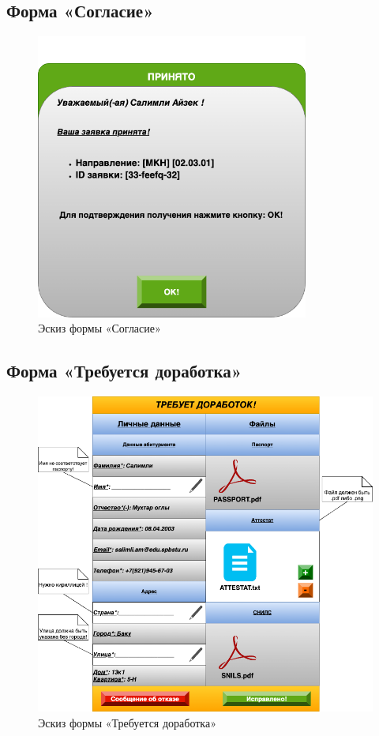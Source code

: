 \documentclass[areasetadvanced]{scrartcl}
\begin{document}
\subsection{Форма «Согласие»}
\begin{figure}[H]
\centering
\includegraphics[width=0.8\textwidth]{images/Prinyato.png}
\caption{Эскиз формы «Согласие»}
\end{figure}

\subsection{Форма «Требуется доработка»}
\begin{figure}[H]
\centering
\includegraphics[width=1.0\textwidth]{images/editpls.png}
\caption{Эскиз формы «Требуется доработка»}
\end{figure}
\end{document}
